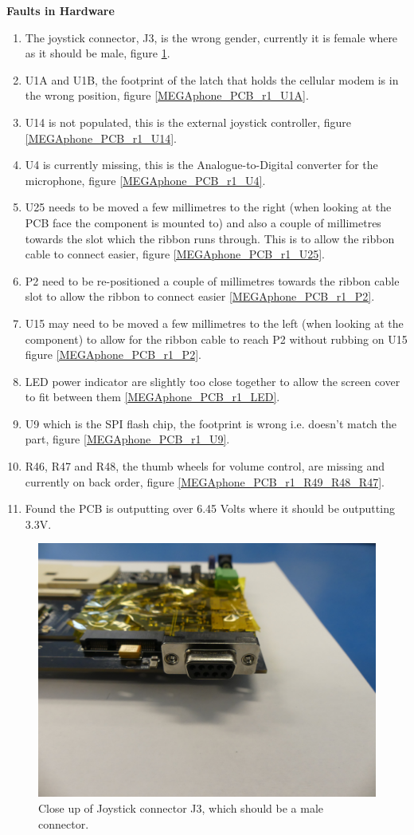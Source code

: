 \textbf{Faults in Hardware}
\begin{enumerate}
\item The joystick connector, J3, is the wrong gender, currently it is female where as it should be male, figure \ref{MEGAphone_PCB_r1_J3}.
\item U1A and U1B, the footprint of the latch that holds the cellular modem is in the wrong position, figure \ref{MEGAphone_PCB_r1_U1A}.
\item U14 is not populated, this is the external joystick controller, figure \ref{MEGAphone_PCB_r1_U14}. 
\item U4 is currently missing, this is the Analogue-to-Digital converter for the microphone, figure \ref{MEGAphone_PCB_r1_U4}.
\item U25 needs to be moved a few millimetres to the right (when looking at the PCB face the component is mounted to) and also a couple of millimetres towards the slot which the ribbon runs through. This is to allow the ribbon cable to connect easier, figure \ref{MEGAphone_PCB_r1_U25}.
\item P2 need to be re-positioned a couple of millimetres towards the ribbon cable slot to allow the ribbon to connect easier \ref{MEGAphone_PCB_r1_P2}.
\item U15 may need to be moved a few millimetres to the left (when looking at the component) to allow for the ribbon cable to reach P2 without rubbing on U15 figure \ref{MEGAphone_PCB_r1_P2}.
\item LED power indicator are slightly too close together to allow the screen cover to fit between them \ref{MEGAphone_PCB_r1_LED}.
\item U9 which is the SPI flash chip, the footprint is wrong i.e. doesn't match the part, figure \ref{MEGAphone_PCB_r1_U9}.
\item R46, R47 and R48, the thumb wheels for volume control, are missing and currently on back order, figure \ref{MEGAphone_PCB_r1_R49_R48_R47}.
\item Found the PCB is outputting over 6.45 Volts where it should be outputting 3.3V. \\
\end{enumerate}

\begin{figure} \begin{center}
\includegraphics[width=.3\linewidth]{pics/MEGAphone_PCB_r1_J3} 
\end{center} 
\caption{Close up of Joystick connector J3, which should be a male connector.\\}
\label{MEGAphone_PCB_r1_J3}
\end{figure}

